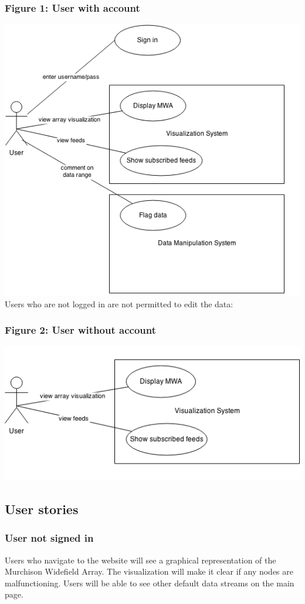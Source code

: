 \documentclass[12pt]{article}
\begin{document}
\begin{spacing}{1.5}
\subsubsection{Figure 1: User with account}
\includegraphics{usecase1} %
\newpage
Users who are not logged in are not permitted to edit the data:
\subsubsection{Figure 2: User without account}
\includegraphics{usecase2}

\subsection{User stories}
\subsubsection{User not signed in}
Users who navigate to the website will see a graphical representation of the Murchison Widefield Array. The visualization will make it clear if any nodes are malfunctioning. Users will be able to see other default data streams on the main page.

\end{spacing}
\end{document}
